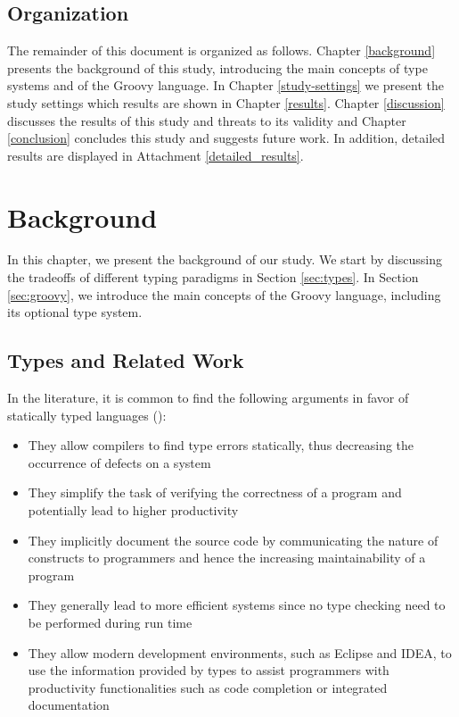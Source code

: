 \documentclass[msc]{ppgccufmg}
\begin{document}
\section{Organization}
The remainder of this document is organized as follows. 
Chapter \ref{background} presents the background of this study, introducing the main concepts of type systems and of the Groovy language.
In Chapter \ref{study-settings} we present the study settings which results are shown in Chapter \ref{results}.
Chapter \ref{discussion} discusses the results of this study and threats to its validity and Chapter \ref{conclusion} concludes this study and suggests future work.
In addition, detailed results are displayed in Attachment \ref{detailed_results}.











%
%
\chapter{Background\label{background}}
In this chapter, we present the background of our study.
We start by discussing the tradeoffs of different typing paradigms in Section \ref{sec:types}.
In Section \ref{sec:groovy}, we introduce the main concepts of the Groovy language, including its optional type system.

\section{Types and Related Work\label{sec:types}}
In the literature, it is common to find the following arguments in favor of statically typed languages (\cite{type_systems, should_your_specification_language_be_typed, mayer2012static, bruch2009learning}):

\begin{itemize}
	\item They allow compilers to find type errors statically, thus decreasing the occurrence of defects on a system
	\item They simplify the task of verifying the correctness of a program and potentially lead to higher productivity
	\item They implicitly document the source code by communicating the nature of constructs to programmers and hence the increasing maintainability of a program
	\item They generally lead to more efficient systems since no type checking need to be performed during run time
	\item They allow modern development environments, such as Eclipse and IDEA, to use the information provided by types to assist programmers with productivity functionalities such as code completion or integrated documentation
\end{itemize}
\end{document}
